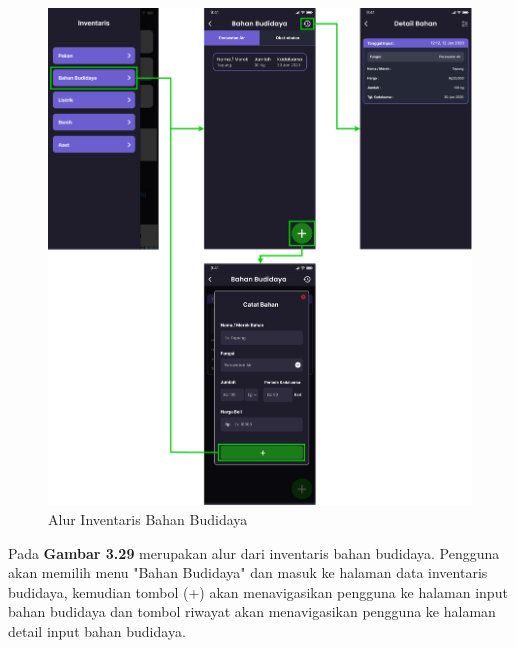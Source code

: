 \begin{spacing}{1.5}
	\begin{figure}[H]
		\centering
		\includegraphics[width=1\textwidth]{gambar/sprint2/flow_materials.png}
		\caption{Alur Inventaris Bahan Budidaya}
	\end{figure}

	Pada \textbf{Gambar 3.29} merupakan alur dari inventaris bahan budidaya. Pengguna akan memilih menu "Bahan Budidaya" dan masuk ke halaman data inventaris budidaya, kemudian tombol (+) akan menavigasikan pengguna ke halaman input bahan budidaya dan tombol riwayat akan menavigasikan pengguna ke halaman detail input bahan budidaya.


\end{spacing}

